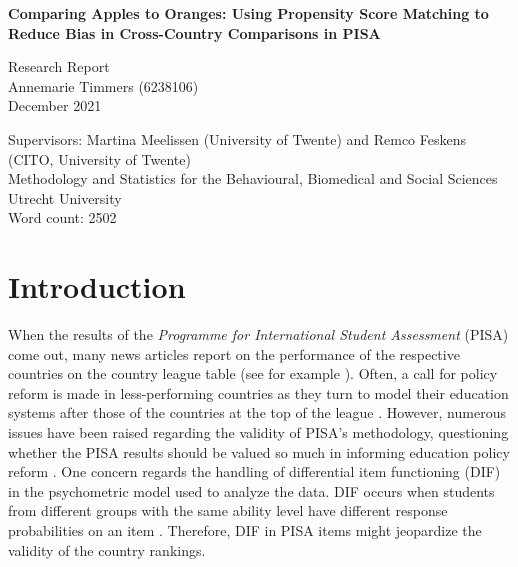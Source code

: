 \documentclass{article}
\begin{document}
\begin{titlepage}
   \begin{center}
       \vspace*{4cm}

       \large\textbf{Comparing Apples to Oranges: Using Propensity Score Matching to Reduce Bias in Cross-Country Comparisons in PISA}

       \vspace{0.5cm}
        \normalsize Research Report \\
        \vspace{0.25cm}
        Annemarie Timmers (6238106) \\
        \vspace{0.25cm}
        December 2021 \\
   \end{center}

       \vfill
       \vspace{0.25cm}
       \raggedright Supervisors: Martina Meelissen (University of Twente) and Remco Feskens (CITO, University of Twente) \\
       \vspace{0.25cm}
       Methodology and Statistics for the Behavioural, Biomedical and Social Sciences \\
       \vspace{0.25cm}
       Utrecht University \\
       \vspace{0.25cm}
       Word count: 2502 \\
   
\end{titlepage}

\newpage
\doublespacing

\section{Introduction} \label{Introduction}

When the results of the \textit{Programme for International Student Assessment} (PISA) come out, many news articles report on the performance of the respective countries on the country league table (see for example \citet{coughlan2019pisa}). Often, a call for policy reform is made in less-performing countries as they turn to model their education systems after those of the countries at the top of the league \citep{sellar2013looking}. However, numerous issues have been raised regarding the validity of PISA's methodology, questioning whether the PISA results should be valued so much in informing education policy reform \citep{araujo2017pisa, fernandez2016methodological, rutkowski2016call}. One concern regards the handling of differential item functioning (DIF) in the psychometric model used to analyze the data. DIF occurs when students from different groups with the same ability level have different response probabilities on an item \citep{ackerman1992didactic}. Therefore, DIF in PISA items might jeopardize the validity of the country rankings. 
\end{document}
